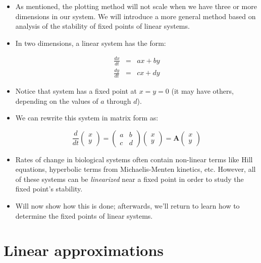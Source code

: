 \documentclass{article}
\begin{document}
\begin{itemize}

\item As mentioned, the plotting method will not scale when we have three or more dimensions in our system. We will introduce a more general method based on analysis of the stability of fixed points of linear systems.

\item In two dimensions, a linear system has the form:

\begin{eqnarray*}
\frac{dx}{dt} & = & ax + by\\
\frac{dy}{dt} & = & cx + dy
\end{eqnarray*}

\item Notice that system has a fixed point at $x=y=0$ (it may have others, depending on the values of $a$ through $d$).

\item We can rewrite this system in matrix form as:

\[ \frac{d}{dt} \begin{pmatrix} x\\y \end{pmatrix} = \begin{pmatrix} a & b\\ c & d\end{pmatrix} \begin{pmatrix} x\\ y \end{pmatrix} = \mathbf{A} \begin{pmatrix} x\\ y \end{pmatrix} \]

\item Rates of change in biological systems often contain non-linear terms like Hill equations, hyperbolic terms from Michaelis-Menten kinetics, etc. However, all of these systems can be \textit{linearized} near a fixed point in order to study the fixed point's stability.

\item Will now show how this is done; afterwards, we'll return to learn how to determine the fixed points of linear systems.

\end{itemize}

\section*{Linear approximations}
\end{document}
